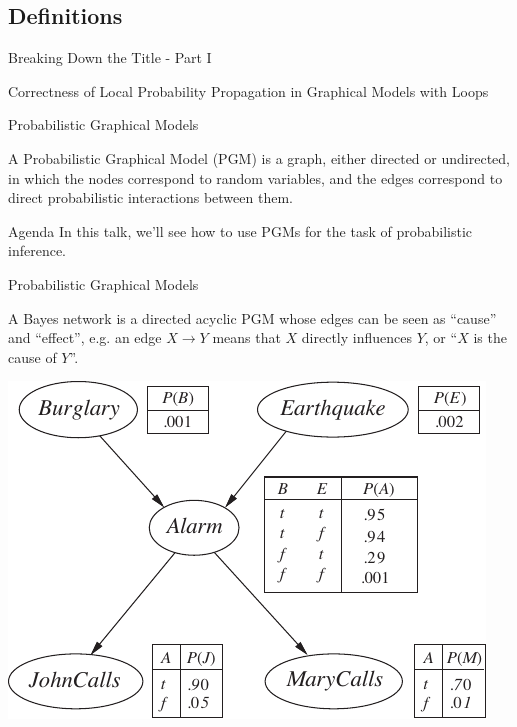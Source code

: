 \documentclass{beamer}
\begin{document}
\subsection{Definitions}
\begin{frame}{Breaking Down the Title - Part I}
    \begin{center}
        \Large{Correctness of Local Probability Propagation in \alert<2>{Graphical Models} with Loops}
    \end{center}
\end{frame}
\begin{frame}{Probabilistic Graphical Models}
    \pause
    \begin{definition}
        A Probabilistic Graphical Model (PGM) is a graph, either directed or undirected, in which the nodes correspond to random variables,
        and the edges correspond to direct probabilistic interactions between them.
    \end{definition}
    \pause
    \begin{block}{Agenda}
        In this talk, we'll see how to use PGMs for the task of probabilistic inference.
    \end{block}
\end{frame}
\begin{frame}{Probabilistic Graphical Models}
    \pause
    \begin{definition}
        A Bayes network is a directed acyclic PGM whose edges can be seen as ``cause'' and ``effect'', e.g. an
        edge $ X \rightarrow Y $ means that $ X $ directly influences $ Y $, or ``$ X $ is the cause of $ Y $''.
    \end{definition}
    \pause
    \begin{center}
        \includegraphics[scale=0.75]{burglary2}\\
    \end{center}
\end{frame}
\end{document}
